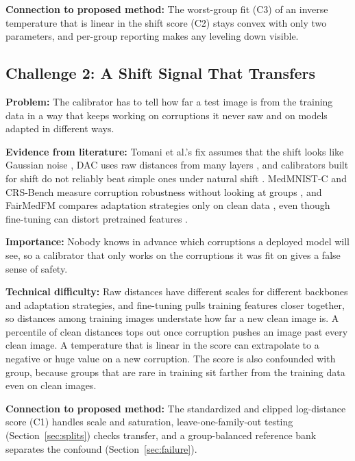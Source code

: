 \documentclass[sigconf,nonacm]{acmart}
\begin{document}
\textbf{Connection to proposed method:} The worst-group fit (C3) of an inverse temperature that is linear in the shift score (C2) stays convex with only two parameters, and per-group reporting makes any leveling down visible.

\subsection{Challenge 2: A Shift Signal That Transfers}
\label{sec:ch2}

\textbf{Problem:} The calibrator has to tell how far a test image is from the training data in a way that keeps working on corruptions it never saw and on models adapted in different ways.

\textbf{Evidence from literature:} Tomani et al.'s fix assumes that the shift looks like Gaussian noise \cite{tomani2021posthoc}, DAC uses raw distances from many layers \cite{tomani2023dac}, and calibrators built for shift do not reliably beat simple ones under natural shift \cite{roschewitz2025where}. MedMNIST-C and CRS-Bench measure corruption robustness without looking at groups \cite{disalvo2024medmnistc,lin2026crsbench}, and FairMedFM compares adaptation strategies only on clean data \cite{jin2024fairmedfm}, even though fine-tuning can distort pretrained features \cite{kumar2022finetuning}.

\textbf{Importance:} Nobody knows in advance which corruptions a deployed model will see, so a calibrator that only works on the corruptions it was fit on gives a false sense of safety.

\textbf{Technical difficulty:} Raw distances have different scales for different backbones and adaptation strategies, and fine-tuning pulls training features closer together, so distances among training images understate how far a new clean image is. A percentile of clean distances tops out once corruption pushes an image past every clean image. A temperature that is linear in the score can extrapolate to a negative or huge value on a new corruption. The score is also confounded with group, because groups that are rare in training sit farther from the training data even on clean images.

\textbf{Connection to proposed method:} The standardized and clipped log-distance score (C1) handles scale and saturation, leave-one-family-out testing (Section~\ref{sec:splits}) checks transfer, and a group-balanced reference bank separates the confound (Section~\ref{sec:failure}).
\end{document}
